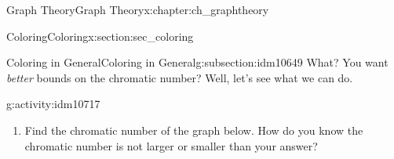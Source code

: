 \documentclass[oneside,10pt,]{book}
\numberwithin{equation}{chapter}
\begin{document}
\begin{chapterptx}{Graph Theory}{}{Graph Theory}{}{}{x:chapter:ch_graphtheory}
\begin{sectionptx}{Coloring}{}{Coloring}{}{}{x:section:sec_coloring}
\begin{subsectionptx}{Coloring in General}{}{Coloring in General}{}{}{g:subsection:idm10649}
What? You want \emph{better} bounds on the chromatic number? Well, let's see what we can do.%
\begin{activity}{}{g:activity:idm10717}%
\begin{enumerate}[font=\bfseries,label=(\alph*),ref=\alph*]
\item{}Find the chromatic number of the graph below.  How do you know the chromatic number is not larger or smaller than your answer?%
\begin{sidebyside}{1}{0.375}{0.375}{0}%
\begin{sbspanel}{0.25}%
\end{sbspanel}
\end{sidebyside}
\end{enumerate}
\end{activity}
\end{subsectionptx}
\end{sectionptx}
\end{chapterptx}
\end{document}
